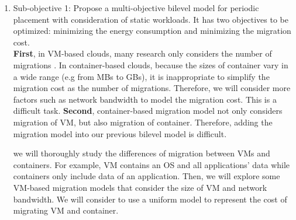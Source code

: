 \begin{enumerate}
	\item Sub-objective 1: Propose a multi-objective bilevel model for periodic placement with consideration of static workloads.  It has two objectives to be optimized: minimizing the energy consumption and minimizing the migration cost. \\

	\textbf{First}, in VM-based clouds, many research only considers the number of migrations \cite{Murtazaev:2014eo}. In container-based clouds, because the sizes of container vary in a wide range (e.g from MBs to GBs), it is inappropriate to simplify the migration cost as the number of migrations. Therefore, we will consider more factors such as network bandwidth to model the migration cost. This is a difficult task. \textbf{Second}, container-based migration model not only considers migration of VM, but also migration of container. Therefore, adding the migration model into our previous bilevel model is difficult. 

	 we will thoroughly study the differences of migration between VMs and containers. For example, VM contains an OS and all applications' data while containers only include data of an application. Then, we will explore some VM-based migration models that consider the size of VM and network bandwidth. We will consider to use a uniform model to represent the  cost of migrating VM and container.




\end{enumerate}
